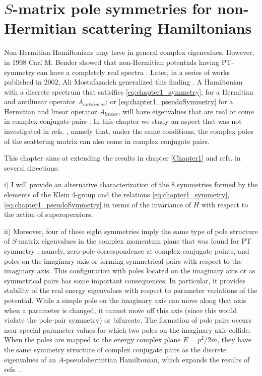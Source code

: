 
\chapter{$S$-matrix pole symmetries for non-Hermitian scattering Hamiltonians}
\label{Chapter2}

Non-Hermitian Hamiltonians may have in general complex eigenvalues. However, in 1998 Carl M. Bender showed that non-Hermitian potentials having PT-symmetry can have a completely real spectra \cite{Bender1998}. Later, in a series of works published in 2002, Ali Mostafazadeh generalized this finding \cite{Mostafazadeh2002,Mostafazadeh2002a,Mostafazadeh2002b}. A Hamiltonian with a discrete spectrum that satisifies \eqref{eq:chapter1_symmetry}, for a Hermitian and antilinear operator $A_{antilinear}$; or \eqref{eq:chapter1_pseudoSymmetry} for a Hermitian and linear operator $A_{linear}$, will have eigenvalues that are real or come in complex-conjugate pairs \cite{Mostafazadeh2002,Mostafazadeh2002a,Mostafazadeh2002b}. In this chapter we study an aspect that was not investigated in refs. \cite{Mostafazadeh2002,Mostafazadeh2002a,Mostafazadeh2002b}, namely that, under the same conditions, the complex poles of the scattering matrix can also come in complex conjugate pairs.

This chapter aims at extending the results in chapter \ref{Chapter1} and refs. \cite{Mostafazadeh2002,Mostafazadeh2002a,Mostafazadeh2002b} in several directions:

i) I will provide an alternative characterization of the 8 symmetries formed by the elements of the Klein 4-group and the relations \eqref{eq:chapter1_symmetry}, \eqref{eq:chapter1_pseudoSymmetry} in terms of the invariance of $H$ with respect to the action of superoperators.

ii) Moreover,
four of these eight symmetries imply the same
type of pole structure of $S$-matrix eigenvalues in the complex momentum plane that was found for PT symmetry \cite{Muga2004},
namely, zero-pole correspondence at complex-conjugate points, and poles on the imaginary axis or forming symmetrical pairs with respect to the imaginary
axis. This configuration with poles located on the imaginary  axis or as symmetrical pairs has some important consequences. In particular, it provides stability of the real energy eigenvalues with respect to parameter variations of the potential. While a simple pole on the imaginary axis can move along that axis when a parameter is changed, it cannot move off this axis (since this would violate the pole-pair symmetry) or bifurcate. The formation of pole pairs occurs near special  parameter values for which two poles on the imaginary axis collide. When the poles are mapped to the energy complex plane $E = p^2/2m$, they have the same symmetry structure of complex conjugate pairs as the discrete eigenvalues of an $A$-pseudohermitian Hamiltonian, which expands the results of refs. \cite{Mostafazadeh2002,Mostafazadeh2002a,Mostafazadeh2002b}.

